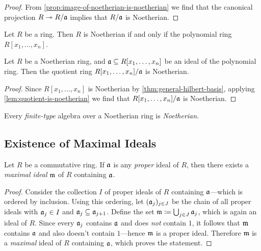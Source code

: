 \begin{proof}
From \cref{prop:image-of-noetherian-is-noetherian} we find that the canonical
projection \(R \twoheadrightarrow R/\mathfrak{a}\) implies that \(R/\mathfrak{a}\) is Noetherian.
\end{proof}

\begin{theorem}
\label{thm:general-hilbert-basis}
Let \(R\) be a ring. Then \(R\) is Noetherian if and only if the polynomial ring
\(R[x_1, \dots, x_n]\).
\end{theorem}


\begin{corollary}
\label{cor:noetherian-quotient-poly-ring}
Let \(R\) be a Noetherian ring, and \(\mathfrak{a} \subseteq R[x_1, \dots, x_n]\)
be an ideal of the polynomial ring. Then the quotient ring
\(R[x_1, \dots, x_n]/\mathfrak{a}\) is Noetherian.
\end{corollary}

\begin{proof}
Since \(R[x_1, \dots, x_n]\) is Noetherian by \cref{thm:general-hilbert-basis},
applying \cref{lem:quotient-is-noetherian} we find that \(R[x_1, \dots,
x_n]/\mathfrak{a}\) is Noetherian.
\end{proof}

\begin{corollary}
\label{cor:finite-type-alg-noetherian}
Every \emph{finite-type} algebra over a Noetherian ring is \emph{Noetherian}.
\end{corollary}

\subsection{Existence of Maximal Ideals}

\begin{proposition}
\label{prop:commutative-rings-have-maximal-ideals}
Let \(R\) be a commutative ring. If \(\mathfrak{a}\) is any \emph{proper} ideal of
\(R\), then there exists a \emph{maximal ideal} \(\mathfrak{m}\) of \(R\) containing
\(\mathfrak{a}\).
\end{proposition}

\begin{proof}
Consider the collection \(I\) of proper ideals of \(R\) containing
\(\mathfrak{a}\)---which is ordered by inclusion. Using this ordering, let
\((\mathfrak{a}_j)_{j \in J}\) be the chain of all proper ideals with
\(\mathfrak{a}_j \in I\) and \(\mathfrak{a}_j \subseteq \mathfrak{a}_{j+1}\). Define the set
\(\mathfrak{m} \coloneq \bigcup_{j \in J} \mathfrak{a}_j\), which is again an ideal of
\(R\). Since every \(\mathfrak{a}_j\) contains \(\mathfrak{a}\) and does \emph{not}
contain \(1\), it follows that \(\mathfrak{m}\) contains \(\mathfrak{a}\) and also
doesn't contain \(1\)---hence \(\mathfrak{m}\) is a proper ideal. Therefore
\(\mathfrak{m}\) is a \emph{maximal} ideal of \(R\) containing \(\mathfrak{a}\), which
proves the statement.
\end{proof}

